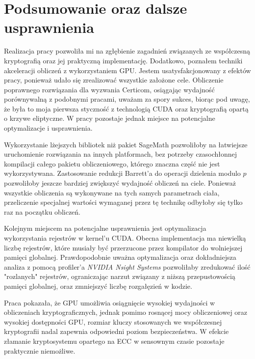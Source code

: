 \newpage
\section{Podsumowanie oraz dalsze usprawnienia}

Realizacja pracy pozwoliła mi na zgłębienie zagadnień związanych ze
współczesną kryptografią oraz jej praktyczną implementację. Dodatkowo,
poznałem techniki akceleracji obliczeń z wykorzystaniem GPU. Jestem
usatysfakcjonowany z efektów pracy, ponieważ udało się zrealizować wszystkie
założone cele. Obliczenie poprawnego rozwiązania dla wyzwania Certicom,
osiągając wydajność porównywalną z podobnymi pracami, uważam za spory sukces,
biorąc pod uwagę, że była to moja pierwsza styczność z technologią CUDA oraz
kryptografią opartą o krzywe eliptyczne. W pracy pozostaje jednak miejsce na
potencjalne optymalizacje i usprawnienia.

Wykorzystanie lżejszych bibliotek niż pakiet SageMath pozwoliłoby na
łatwiejsze uruchomienie rozwiązania na innych platformach, bez potrzeby
czasochłonnej kompilacji całego pakietu obliczeniowego, którego znaczna
część nie jest wykorzystywana.
Zastosowanie redukcji Barrett'a do operacji dzielenia modulo $p$ pozwoliłoby
jeszcze bardziej zwiększyć wydajność obliczeń na ciele. Ponieważ wszystkie
obliczenia są wykonywane na tych samych parametrach ciała, przeliczenie
specjalnej wartości wymaganej przez tę technikę odbyłoby się tylko raz na
początku obliczeń.

Kolejnym miejscem na potencjalne usprawnienia jest optymalizacja wykorzystania 
rejestrów w kernel'u CUDA. Obecna implementacja ma niewielką liczbę rejestrów,
które musiały być przerzucone przez kompilator do wolniejszej pamięci
globalnej. Prawdopodobnie uważna optymalizacja oraz dokładniejsza analiza z
pomocą profiler'a \textit{NVIDIA Nsight Systems} pozwoliłaby zredukować ilość
"rozlanych" rejestrów, ograniczając narzut związany z niższą
przepustowością pamięci globalnej, oraz zmniejszyć liczbę rozgałęzień w kodzie.

Praca pokazała, że GPU umożliwia osiągnięcie wysokiej wydajności w obliczeniach
kryptograficznych, jednak pomimo rosnącej mocy obliczeniowej oraz wysokiej dostępności
GPU, rozmiar kluczy stosowanych we współczesnej kryptografii nadal zapewnia
odpowiedni poziom bezpieczeństwa. W efekcie złamanie kryptosystemu opartego na
ECC w sensownym czasie pozostaje praktycznie niemożliwe.